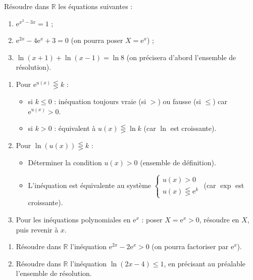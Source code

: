 \documentclass[11pt]{article}
\begin{document}
\begin{exercice}[Équations]
Résoudre dans $\mathbb{R}$ les équations suivantes :
\begin{enumerate}
\item $\mathrm{e}^{x^{2}-3x} = 1$ ;
\item $\mathrm{e}^{2x} - 4\mathrm{e}^{x} + 3 = 0$ (on pourra poser $X = \mathrm{e}^{x}$) ;
\item $\ln(x+1) + \ln(x-1) = \ln 8$ (on précisera d'abord l'ensemble de résolution).
\end{enumerate}
\end{exercice}

\begin{methode}
\begin{enumerate}
\item Pour $\mathrm{e}^{u(x)} \lesseqgtr k$ : 
      \begin{itemize}
      \item si $k \le 0$ : inéquation toujours vraie (si $>$) ou fausse (si $\le$) car $\mathrm{e}^{u(x)} > 0$.
      \item si $k > 0$ : équivalent à $u(x) \lesseqgtr \ln k$ (car $\ln$ est croissante).
      \end{itemize}
\item Pour $\ln(u(x)) \lesseqgtr k$ : 
      \begin{itemize}
      \item Déterminer la condition $u(x) > 0$ (ensemble de définition).
      \item L'inéquation est équivalente au système $\begin{cases} u(x) > 0 \\ u(x) \lesseqgtr \mathrm{e}^k \end{cases}$ (car $\exp$ est croissante).
      \end{itemize}
\item Pour les inéquations polynomiales en $\mathrm{e}^x$ : poser $X = \mathrm{e}^x > 0$, résoudre en $X$, puis revenir à $x$.
\end{enumerate}
\end{methode}

\begin{exercice}[Inéquations]
\begin{enumerate}
\item Résoudre dans $\mathbb{R}$ l'inéquation $\mathrm{e}^{2x} - 2\mathrm{e}^{x} > 0$ (on pourra factoriser par $\mathrm{e}^{x}$).
\item Résoudre dans $\mathbb{R}$ l'inéquation $\ln(2x-4) \leq 1$, en précisant au préalable l'ensemble de résolution.
\end{enumerate}
\end{exercice}
\end{document}
